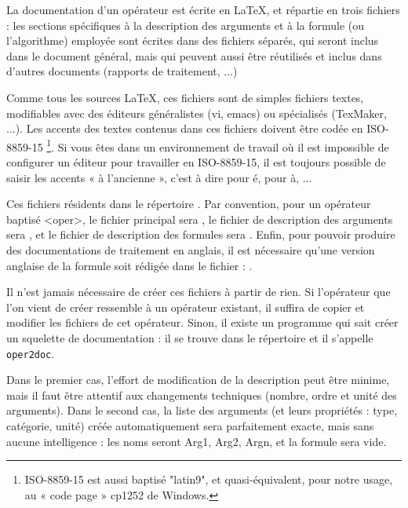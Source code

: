   La documentation d'un opérateur est écrite en \LaTeX, et répartie en
trois fichiers : les sections spécifiques à la description des arguments
et à la formule (ou l'algorithme) employée sont écrites dans des fichiers
séparés,
qui seront inclus dans le document général, mais qui peuvent aussi être
réutilisés et inclus dans
d'autres documents (rapports de traitement, ...)

   Comme tous les sources LaTeX, ces fichiers sont de simples fichiers
textes, modifiables avec des éditeurs généralistes (vi, emacs) ou
spécialisés (TexMaker, ...). Les
accents des textes contenus dans ces fichiers doivent être codée en
ISO-8859-15
\footnote{ISO-8859-15 est aussi baptisé
"latin9", et quasi-équivalent, pour notre usage, au
« code page » cp1252 de Windows.}.
Si vous êtes dans un environnement de travail où il est
impossible de configurer
un éditeur pour travailler en ISO-8859-15, il est toujours possible de
saisir les accents
« à l'ancienne », c'est à dire  pour é, 
 pour à, ...

Ces fichiers résidents dans le répertoire . Par
convention, pour un opérateur baptisé
<oper>, le fichier principal sera , le fichier de
description des arguments sera ,
et le fichier de description des formules sera
. 
Enfin, pour pouvoir produire
des documentations de traitement en anglais, 
il est nécessaire qu'une version anglaise de la formule 
soit rédigée dans le fichier :
.

 Il n'est jamais nécessaire de créer ces fichiers à partir de rien. Si
l'opérateur que l'on vient de créer ressemble à un opérateur existant,
il suffira de copier et modifier les fichiers de
cet opérateur.
Sinon, il existe un programme qui sait créer un squelette de
documentation : il se trouve
dans le répertoire  et il s'appelle
\texttt{oper2doc}.

Dans le premier cas, l'effort de modification de la description peut
être minime, mais il
faut être attentif aux changements techniques (nombre, ordre et unité
des arguments).
Dans le second cas, la liste des arguments (et leurs propriétés : type,
catégorie, unité) créée
automatiquement sera parfaitement exacte, mais sans aucune intelligence
: les noms
seront Arg1, Arg2, Argn, et la formule sera vide.

